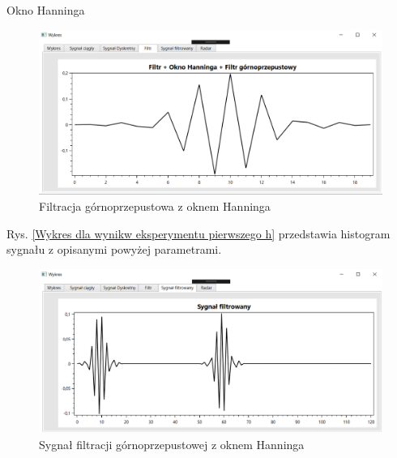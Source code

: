 \documentclass[12pt]{article}
\begin{document}
\newpage
Okno Hanninga
\begin{figure}[h!]
 \centering
 \includegraphics[width=12.3cm]{prostFGOHn.PNG}
 \vspace{-0.3cm}
 \caption{Filtracja górnoprzepustowa z oknem Hanninga}
 \label{Wykres dla wyników eksperymentu drugiego}
\end{figure}
\newpage
Rys. \ref{Wykres dla wynikw eksperymentu pierwszego h} przedstawia histogram sygnału z opisanymi powyżej parametrami. 
\begin{figure}[h!]
 \centering
 \includegraphics[width=12.3cm]{prostSFGHn.PNG}
 \vspace{-0.3cm}
 \caption{Sygnał filtracji górnoprzepustowej z oknem Hanninga}
 \label{Histogram dla wyników eksperymentu drugiego}
\end{figure}
\end{document}
